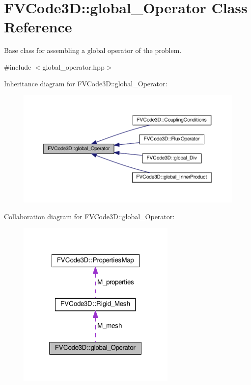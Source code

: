 \hypertarget{classFVCode3D_1_1global__Operator}{}\section{F\+V\+Code3D\+:\+:global\+\_\+\+Operator Class Reference}
\label{classFVCode3D_1_1global__Operator}


Base class for assembling a global operator of the problem.  




{\ttfamily \#include $<$global\+\_\+operator.\+hpp$>$}



Inheritance diagram for F\+V\+Code3D\+:\+:global\+\_\+\+Operator\+:
\nopagebreak
\begin{figure}[H]
\begin{center}
\leavevmode
\includegraphics[width=350pt]{classFVCode3D_1_1global__Operator__inherit__graph}
\end{center}
\end{figure}


Collaboration diagram for F\+V\+Code3D\+:\+:global\+\_\+\+Operator\+:
\nopagebreak
\begin{figure}[H]
\begin{center}
\leavevmode
\includegraphics[width=220pt]{classFVCode3D_1_1global__Operator__coll__graph}
\end{center}
\end{figure}
